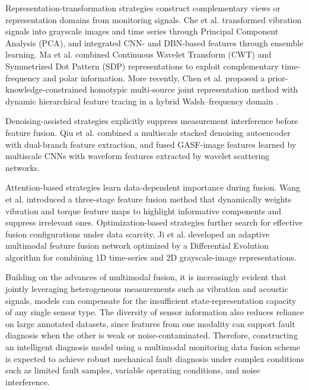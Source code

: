 \documentclass[a4paper]{cas-sc}
\begin{document}
Representation-transformation strategies construct complementary views or representation domains from monitoring signals. Che et al.\cite{Prove1} transformed vibration signals into grayscale images and time series through Principal Component Analysis (PCA), and integrated CNN- and DBN-based features through ensemble
learning. Ma et al.\cite{Prove3} combined Continuous Wavelet Transform (CWT) and Symmetrized Dot Pattern (SDP) representations to exploit complementary time-frequency and polar information. More recently, Chen et al. proposed a prior-knowledge-constrained
homotypic multi-source joint representation method with dynamic hierarchical feature tracing in a hybrid Walsh--frequency domain \cite{ChenMSSP2026}.

Denoising-assisted strategies explicitly suppress measurement interference before feature fusion. Qiu et al.\cite{Prove2} combined a multiscale stacked denoising autoencoder with dual-branch feature extraction, and fused GASF-image features learned by multiscale CNNs with waveform features extracted by wavelet scattering networks.

Attention-based strategies learn data-dependent importance during fusion. Wang et al.\cite{Prove4} introduced a three-stage feature fusion method that dynamically weights vibration and torque feature
maps to highlight informative components and suppress irrelevant ones. Optimization-based strategies further search for effective fusion configurations under data scarcity. Ji et al.\cite{Prove5} developed an adaptive multimodal feature fusion network optimized by a Differential Evolution algorithm for combining 1D time-series and 2D grayscale-image representations.

Building on the advances of multimodal fusion, it is increasingly evident that jointly leveraging heterogeneous measurements such as vibration and acoustic signals, models can compensate for the insufficient state-representation capacity of any single sensor type. The diversity of sensor information also reduces reliance on large annotated datasets, since features from one modality can support fault diagnosis when the other is weak or noise-contaminated. Therefore, constructing an intelligent diagnosis model using a multimodal monitoring data fusion scheme is expected to achieve robust mechanical fault diagnosis under complex conditions such as limited fault samples, variable operating conditions, and noise interference.
\end{document}
